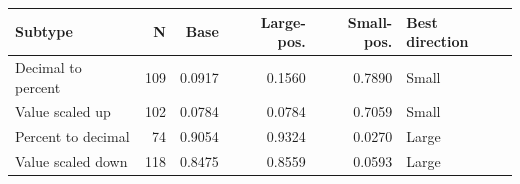 \begin{tabular}{lrrrrl}
\toprule
Subtype & N & Base & Large-pos. & Small-pos. & Best direction \\
\midrule
Decimal to percent & 109 & 0.0917 & 0.1560 & 0.7890 & Small \\
Value scaled up & 102 & 0.0784 & 0.0784 & 0.7059 & Small \\
Percent to decimal & 74 & 0.9054 & 0.9324 & 0.0270 & Large \\
Value scaled down & 118 & 0.8475 & 0.8559 & 0.0593 & Large \\
\bottomrule
\end{tabular}
